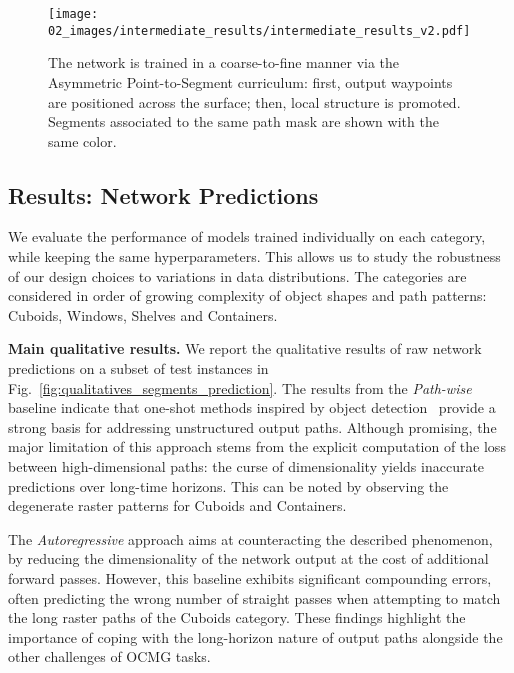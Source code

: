 \begin{figure*}[!t]
    \centering
    \texttt{[image: 02\_images/intermediate\_results/intermediate\_results\_v2.pdf]}
    \caption{
    The network is trained in a coarse-to-fine manner via the Asymmetric Point-to-Segment curriculum:
    first, output waypoints are positioned across the surface; then, local structure is promoted.
    Segments associated to the same path mask are shown with the same color.
    }
    \label{fig:intermediate_results}
\end{figure*}




\subsection{Results: Network Predictions}
\label{sec:results_network_predictons}
We evaluate the performance of models trained individually on each category, while keeping the same hyperparameters.
This allows us to study the robustness of our design choices to variations in data distributions.
The categories are considered in order of growing complexity of object shapes and path patterns: Cuboids, Windows, Shelves and Containers. 

\medskip
\noindent \textbf{Main qualitative results.}
We report the qualitative results of raw network predictions on a subset of test instances in Fig.~\ref{fig:qualitatives_segments_prediction}.
The results from the \emph{Path-wise} baseline indicate that one-shot methods inspired by object detection~\cite{redmon2016yolo,carion2020detr,cheng2021maskformer} provide a strong basis for addressing unstructured output paths.
Although promising, the major limitation of this approach stems from the explicit computation of the loss between high-dimensional paths: the curse of dimensionality yields inaccurate predictions over long-time horizons. This can be noted by observing the degenerate raster patterns for Cuboids and Containers. 

The \emph{Autoregressive} approach aims at counteracting the described  phenomenon, by reducing the dimensionality of the network output at the cost of additional forward passes.
However, this baseline exhibits significant compounding errors, often predicting the wrong number of straight passes when attempting to match the long raster paths of the Cuboids category.
These findings highlight the importance of coping with the long-horizon nature of output paths alongside the other challenges of OCMG tasks.

